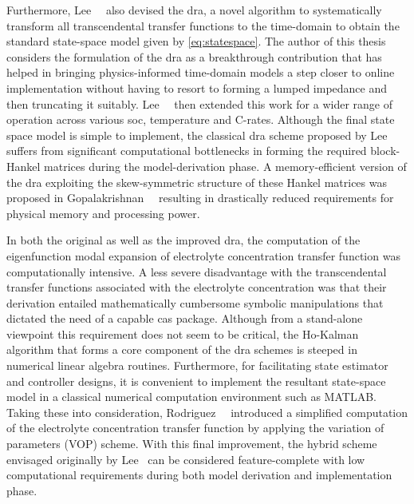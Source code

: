Furthermore,  Lee~\etal{}~\cite{Lee2012a} also  devised the  \gls{dra}, a  novel
algorithm  to systematically  transform  all  transcendental transfer  functions
to  the  time-domain   to  obtain  the  standard  state-space   model  given  by
\cref{eq:statespace}. The  author of  this thesis  considers the  formulation of
the  \gls{dra}  as a  breakthrough  contribution  that  has helped  in  bringing
physics-informed  time-domain  models a  step  closer  to online  implementation
without   having  to   resort   to   forming  a   lumped   impedance  and   then
truncating  it  suitably.  Lee~\etal{}~\cite{Lee2014} then  extended  this  work
for  a  wider range  of  operation  across  various \gls{soc},  temperature  and
C-rates.  Although the  final  state space  model is  simple  to implement,  the
classical  \gls{dra} scheme  proposed  by Lee~\etal{}  suffers from  significant
computational bottlenecks  in forming the required  block-Hankel matrices during
the  model-derivation  phase.  A   memory-efficient  version  of  the  \gls{dra}
exploiting the  skew-symmetric structure of  these Hankel matrices  was proposed
in  Gopalakrishnan~\etal{}~\cite{Gopalakrishnan2017}  resulting  in  drastically
reduced requirements for physical memory and processing power.


In both the original  as well as the improved \gls{dra},  the computation of the
eigenfunction modal expansion of electrolyte concentration transfer function was
computationally intensive.  A less  severe disadvantage with  the transcendental
transfer  functions  associated  with  the electrolyte  concentration  was  that
their  derivation  entailed  mathematically  cumbersome  symbolic  manipulations
that  dictated  the   need  of  a  capable  \gls{cas}   package.  Although  from
a  stand-alone  viewpoint  this  requirement  does  not  seem  to  be  critical,
the  Ho-Kalman  algorithm   that  forms  a  core  component   of  the  \gls{dra}
schemes  is  steeped in  numerical  linear  algebra routines.  Furthermore,  for
facilitating  state  estimator  and  controller designs,  it  is  convenient  to
implement the resultant  state-space model in a  classical numerical computation
environment   such  as   \textsc{MATLAB}.  Taking   these  into   consideration,
Rodriguez~\etal{}~\cite{Rodriguez2017}  introduced a  simplified computation  of
the electrolyte  concentration transfer  function by  applying the  variation of
parameters  (VOP)  scheme.  With  this  final  improvement,  the  hybrid  scheme
envisaged originally by Lee~\etal{} can  be considered feature-complete with low
computational  requirements  during  both model  derivation  and  implementation
phase.


